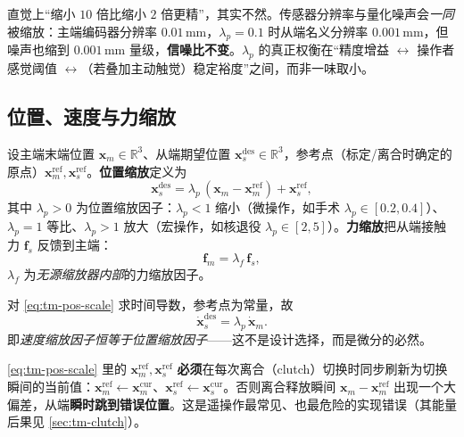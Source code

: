 \begin{insight}\label{ins:tm-scale-snr}
直觉上“缩小 $10$ 倍比缩小 $2$ 倍更精”，其实不然。传感器分辨率与量化噪声会\emph{一同}被缩放：主端编码器分辨率 $0.01\,$mm，$\lambda_p=0.1$ 时从端名义分辨率 $0.001\,$mm，但噪声也缩到 $0.001\,$mm 量级，\textbf{信噪比不变}。$\lambda_p$ 的真正权衡在“精度增益 $\leftrightarrow$ 操作者感觉阈值 $\leftrightarrow$（若叠加主动触觉）稳定裕度”之间，而非一味取小。
\end{insight}

\subsection{位置、速度与力缩放}
\label{sec:tm-pvf}

\begin{definition}[主从运动缩放]\label{def:tm-scaling}
设主端末端位置 $\mathbf{x}_m\in\mathbb{R}^3$、从端期望位置 $\mathbf{x}_s^{\text{des}}\in\mathbb{R}^3$，参考点（标定/离合时确定的原点）$\mathbf{x}_m^{\text{ref}},\mathbf{x}_s^{\text{ref}}$。\textbf{位置缩放}定义为
\begin{equation}
  \mathbf{x}_s^{\text{des}}=\lambda_p\,(\mathbf{x}_m-\mathbf{x}_m^{\text{ref}})+\mathbf{x}_s^{\text{ref}},
  \label{eq:tm-pos-scale}
\end{equation}
其中 $\lambda_p>0$ 为位置缩放因子：$\lambda_p<1$ 缩小（微操作，如手术 $\lambda_p\in[0.2,0.4]$）、$\lambda_p=1$ 等比、$\lambda_p>1$ 放大（宏操作，如核退役 $\lambda_p\in[2,5]$）。\textbf{力缩放}把从端接触力 $\mathbf{f}_s$ 反馈到主端：
\begin{equation}
  \mathbf{f}_m=\lambda_f\,\mathbf{f}_s,
  \label{eq:tm-force-scale}
\end{equation}
$\lambda_f$ 为\emph{无源缩放器内部}的力缩放因子。
\end{definition}

\begin{proposition}[速度缩放因子被位置缩放锁定]\label{prop:tm-vel}
对 \cref{eq:tm-pos-scale} 求时间导数，参考点为常量，故
\begin{equation}
  \dot{\mathbf{x}}_s^{\text{des}}=\lambda_p\,\dot{\mathbf{x}}_m.
  \label{eq:tm-vel-scale}
\end{equation}
即\emph{速度缩放因子恒等于位置缩放因子}——这不是设计选择，而是微分的必然。
\end{proposition}

\begin{pitfall}
\cref{eq:tm-pos-scale} 里的 $\mathbf{x}_m^{\text{ref}},\mathbf{x}_s^{\text{ref}}$ \textbf{必须}在每次离合（clutch）切换时同步刷新为切换瞬间的当前值：$\mathbf{x}_m^{\text{ref}}\!\leftarrow\!\mathbf{x}_m^{\text{cur}}$、$\mathbf{x}_s^{\text{ref}}\!\leftarrow\!\mathbf{x}_s^{\text{cur}}$。否则离合释放瞬间 $\mathbf{x}_m-\mathbf{x}_m^{\text{ref}}$ 出现一个大偏差，从端\textbf{瞬时跳到错误位置}。这是遥操作最常见、也最危险的实现错误（其能量后果见 \cref{sec:tm-clutch}）。
\end{pitfall}

